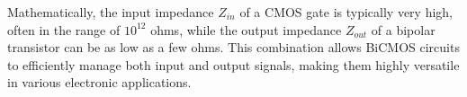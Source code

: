 Mathematically, the input impedance \( Z_{in} \) of a CMOS gate is typically very high, often in the range of \( 10^{12} \) ohms, while the output impedance \( Z_{out} \) of a bipolar transistor can be as low as a few ohms. This combination allows BiCMOS circuits to efficiently manage both input and output signals, making them highly versatile in various electronic applications.


